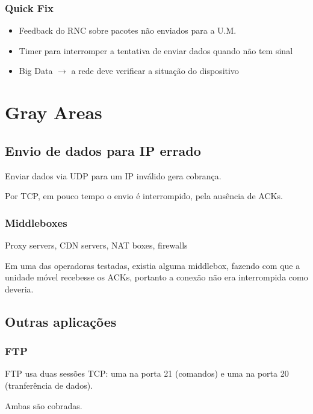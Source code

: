 \documentclass[brazil]{beamer}
\begin{document}
\begin{frame}[fragile]
        \frametitle{Quick Fix}
        \begin{itemize}
            \item Feedback do RNC sobre pacotes não enviados para a U.M.
            \item Timer para interromper a tentativa de enviar dados quando não tem sinal
            \item Big Data $\rightarrow$ a rede deve verificar a situação do dispositivo
        \end{itemize}
\end{frame}

\section{Gray Areas}

\subsection{Envio de dados para IP errado}

\begin{frame}[fragile]
    Enviar dados via UDP para um IP inválido gera cobrança.

    \vspace{0.4cm}
    Por TCP, em pouco tempo o envio é interrompido, pela ausência de ACKs.
\end{frame}

\begin{frame}[fragile]
    \frametitle{Middleboxes}
    Proxy servers, CDN servers, NAT boxes, firewalls

    \vspace{0.4cm}
    \pause
    Em uma das operadoras testadas, existia alguma middlebox, fazendo com que a unidade móvel recebesse os ACKs, portanto a conexão não era interrompida como deveria.
\end{frame}

\subsection{Outras aplicações}

\begin{frame}[fragile]
    \frametitle{FTP}
    FTP usa duas sessões TCP: uma na porta 21 (comandos) e uma na porta 20 (tranferência de dados).

    \vspace{0.5cm}
    Ambas são cobradas.
\end{frame}
\end{document}

